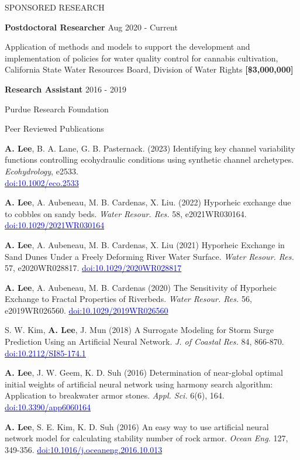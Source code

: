 \documentclass{resume_anzy} %
\begin{document}
\vspace{2.5mm}


\begin{rSection}{SPONSORED RESEARCH}
\vspace{-2.5mm}
\item \textbf{Postdoctoral Researcher} \hfill{Aug 2020 - Current}
\item  Application of methods and models to support the development and implementation of policies for water quality control for cannabis cultivation, California State Water Resources Board, Division of Water Rights \textbf{[\$3,000,000]}
\item \textbf{Research Assistant} \hfill{2016 - 2019}
\item Purdue Research Foundation
\end{rSection}

\begin{rSection}{Peer Reviewed Publications}
\vspace{-2.5mm}
\item \textbf{A. Lee}, B. A. Lane, G. B. Pasternack. (2023) Identifying key channel variability functions controlling ecohydraulic conditions using synthetic channel archetypes.  \textit{Ecohydrology}, e2533. \\ \href{https://doi.org/10.1002/eco.2533}{\textcolor{blue}{doi:10.1002/eco.2533}}
\item \textbf{A. Lee}, A. Aubeneau, M. B. Cardenas, X. Liu. (2022) Hyporheic exchange due to cobbles on sandy beds. \textit{Water Resour. Res.} 58, e2021WR030164. \href{https://doi.org/10.1029/2021WR030164}{\textcolor{blue}{doi:10.1029/2021WR030164}}
\item \textbf{A. Lee}, A. Aubeneau, M. B. Cardenas, X. Liu (2021) Hyporheic Exchange in Sand Dunes Under a Freely Deforming River Water Surface. \textit{Water Resour. Res.} 57, e2020WR028817. \href{https://doi.org/10.1029/2020WR028817}{\textcolor{blue}{doi:10.1029/2020WR028817}}
\item \textbf{A. Lee}, A. Aubeneau, M. B. Cardenas (2020) The Sensitivity of Hyporheic Exchange to Fractal Properties of Riverbeds. \textit{Water Resour. Res.} 56, e2019WR026560. \href{https://doi.org/10.1029/2019WR026560}{\textcolor{blue}{doi:10.1029/2019WR026560}}
\item S. W. Kim, \textbf{A. Lee}, J. Mun (2018) A Surrogate Modeling for Storm Surge Prediction Using an Artificial Neural Network. \textit{J. of Coastal Res.} 84, 866-870. \href{https://doi.org/10.2112/SI85-174.1}{\textcolor{blue}{doi:10.2112/SI85-174.1}}
\item \textbf{A. Lee}, J. W. Geem, K. D. Suh (2016) Determination of near-global optimal initial weights of artificial neural network using harmony search algorithm: Application to breakwater armor stones. \textit{Appl. Sci.} 6(6), 164. \href{https://doi.org/10.3390/app6060164}{\textcolor{blue}{doi:10.3390/app6060164}}
\item \textbf{A. Lee}, S. E. Kim, K. D. Suh (2016) An easy way to use artificial neural network model for calculating stability number of rock armor. \textit{Ocean Eng.} 127, 349-356.  \href{https://doi.org/10.1016/j.oceaneng.2016.10.013}{\textcolor{blue}{doi:10.1016/j.oceaneng.2016.10.013}}
\end{rSection}
\end{document}
